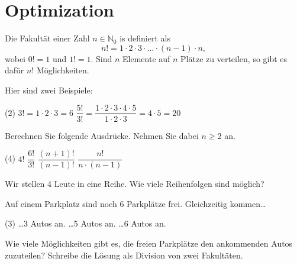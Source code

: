 \section{Optimization} \label{sec:factorial}
\begin{tcolorbox}
	Die Fakultät einer Zahl $n\in\mathbb N_0$ is definiert als
	\begin{equation*}
		n!=1\cdot 2\cdot 3\cdot\ldots\cdot \left(n-1\right)\cdot n,
	\end{equation*}
	wobei $0!=1$ und $1!=1$.
	Sind $n$ Elemente auf $n$ Plätze zu verteilen, so gibt es dafür $n!$ Möglichkeiten.
\end{tcolorbox}
\begin{example}
	Hier sind zwei Beispiele:
	\begin{tasks}(2)
		\task $3!=1\cdot 2\cdot 3=6$
		\task $\dfrac{5!}{3!}=\dfrac{1\cdot 2\cdot 3\cdot 4\cdot 5}{1\cdot 2\cdot 3}=4\cdot 5=20$
	\end{tasks}
\end{example}
\begin{exercise}
	Berechnen Sie folgende Ausdrücke.
	Nehmen Sie dabei $n\geq 2$ an.
	\begin{tasks}(4)
		\task $4!$
		\task $\dfrac{6!}{3!}$
		\task $\dfrac{\left(n+1\right)!}{\left(n-1\right)!}$
		\task $\dfrac{n!}{n\cdot\left(n-1\right)}$
	\end{tasks}
\end{exercise}
\begin{comment}
\begin{solution*}
	\phantom{text}
	\begin{tasks}(4)
		\task $24$
		\task $120$
		\task $n\cdot\left(n+1\right)$
		\task $\left(n-2\right)!$
	\end{tasks}
\end{solution*}
\end{comment}
\begin{exercise}
	Wir stellen 4 Leute in eine Reihe.
	Wie viele Reihenfolgen sind möglich?
\end{exercise}
\begin{comment}
	\begin{solution*}
		Es gibt $4!$ Möglichkeiten.
	\end{solution*}
\end{comment}
\begin{exercise}
	Auf einem Parkplatz sind noch 6 Parkplätze frei.
	Gleichzeitig kommen\ldots
	\begin{tasks}(3)
		\task \ldots $3$ Autos an.
		\task \ldots $5$ Autos an.
		\task \ldots $6$ Autos an.
	\end{tasks}
	Wie viele Möglichkeiten gibt es, die freien Parkplätze den ankommenden Autos zuzuteilen?
	Schreibe die Lösung als Division von zwei Fakultäten.
\end{exercise}

